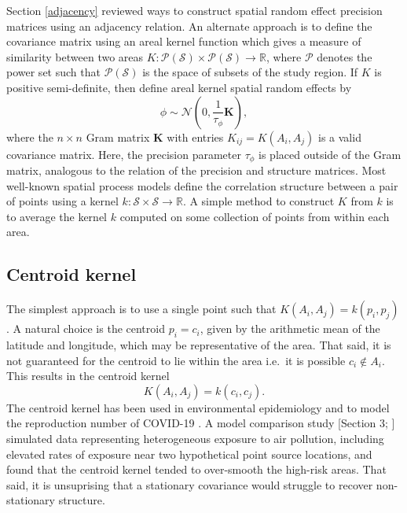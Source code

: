 \documentclass[a4paper, nobind]{templates/ociamthesis}
\begin{document}
Section \ref{adjacency} reviewed ways to construct spatial random effect precision matrices using an adjacency relation.
An alternate approach is to define the covariance matrix using an areal kernel function which gives a measure of similarity between two areas \(K: \mathcal{P}(\mathcal{S}) \times \mathcal{P}(\mathcal{S}) \to \mathbb{R}\), where \(\mathcal{P}\) denotes the power set such that \(\mathcal{P}(\mathcal{S})\) is the space of subsets of the study region.
If \(K\) is positive semi-definite, then define areal kernel spatial random effects by
\begin{equation}
    \phi \sim \mathcal{N} \left( 0, \frac{1}{\tau_\phi} \mathbf{K} \right), \label{eq:arealkernel}
\end{equation}
where the \(n \times n\) Gram matrix \(\mathbf{K}\) with entries \(K_{ij} = K(A_i, A_j)\) is a valid covariance matrix.
Here, the precision parameter \(\tau_\phi\) is placed outside of the Gram matrix, analogous to the relation of the precision and structure matrices.
Most well-known spatial process models define the correlation structure between a pair of points using a kernel \(k: \mathcal{S} \times \mathcal{S} \to \mathbb{R}\).
A simple method to construct \(K\) from \(k\) is to average the kernel \(k\) computed on some collection of points from within each area.

\hypertarget{centroid-kernel}{%
\subsection{Centroid kernel}\label{centroid-kernel}}

The simplest approach is to use a single point such that \(K(A_i, A_j) = k(p_i, p_j)\).
A natural choice is the centroid \(p_i = c_i\), given by the arithmetic mean of the latitude and longitude, which may be representative of the area.
That said, it is not guaranteed for the centroid to lie within the area i.e.~it is possible \(c_i \notin A_i\).
This results in the centroid kernel
\begin{equation}
    K(A_i, A_j) = k(c_i, c_j).
\end{equation}
The centroid kernel has been used in environmental epidemiology \autocite{wakefield1999spatial} and to model the reproduction number of COVID-19 \autocite{teh2021efficient}.
A model comparison study {[}Section 3; \textcite{best2005comparison}{]} simulated data representing heterogeneous exposure to air pollution, including elevated rates of exposure near two hypothetical point source locations, and found that the centroid kernel tended to over-smooth the high-risk areas.
That said, it is unsuprising that a stationary covariance would struggle to recover non-stationary structure.
\end{document}
